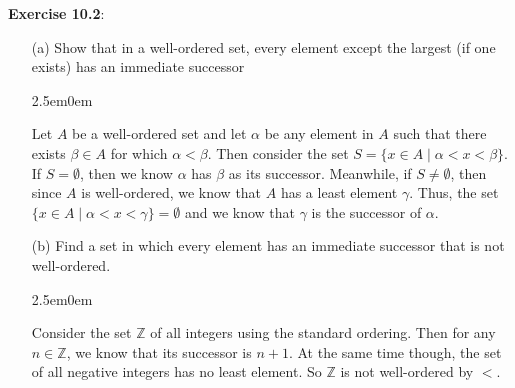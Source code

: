 \documentclass{book}
\newcommand{\exOne}{%
   \color{Purple}%
   \fontsize{14}{16}\selectfont%
}
\newcommand{\exTwo}{%
\color{Purple}%
   \fontsize{13}{15}\selectfont%
}
\newenvironment{myIndent}{%
   \begin{adjustwidth}{2.5em}{0em}%
}{%
   \end{adjustwidth}%
}
\newcommand{\blab}[1]{\textbf{#1}}
\newcommand{\retTwo}{\hfill\bigbreak}
\begin{document}
   \exOne
   \blab{Exercise 10.2}:  
   \begin{itemize}
       \item[(a)] Show that in a well-ordered set, every element except the largest (if one exists) has an immediate successor
       
      \begin{myIndent}\exTwo
         Let $A$ be a well-ordered set and let $\alpha$ be any element in $A$ such that there exists $\beta \in A$ for which $\alpha < \beta$. Then consider the set $S = \{x \in A \mid \alpha < x < \beta\}$. If $S = \emptyset$, then we know $\alpha$ has $\beta$ as its successor. Meanwhile, if $S \neq \emptyset$, then since $A$ is well-ordered, we know that $A$ has a least element $\gamma$. Thus, the set $\{x \in A \mid \alpha < x < \gamma\} = \emptyset$ and we know that $\gamma$ is the successor of $\alpha$.\retTwo
      \end{myIndent}

       \item[(b)] Find a set in which every element has an immediate successor that is not well-ordered. 
       \begin{myIndent}\exTwo
         Consider the set $\mathbb{Z}$ of all integers using the standard ordering. Then for any $n \in \mathbb{Z}$, we know that its successor is $n + 1$. At the same time though, the set of all negative integers has no least element. So $\mathbb{Z}$ is not well-ordered by $<$.\retTwo\retTwo
      \end{myIndent}
   \end{itemize}
\end{document}
